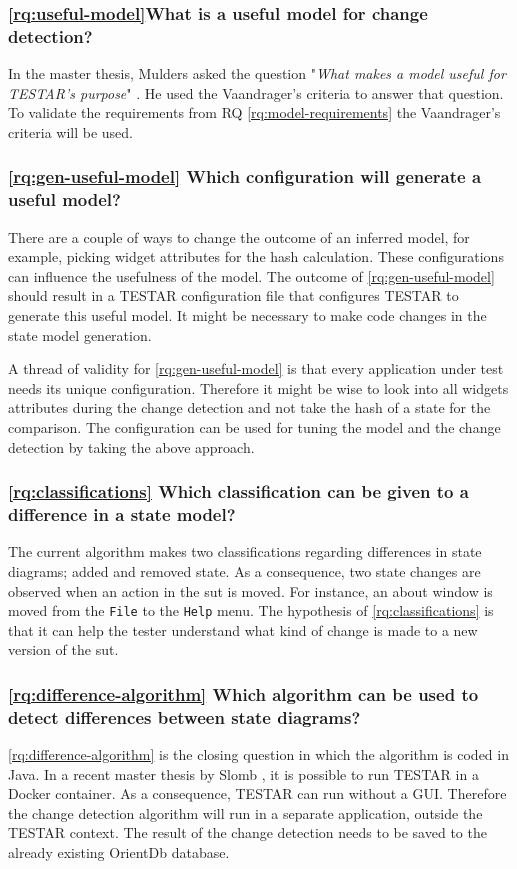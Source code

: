 \subsubsection{\ref{rq:useful-model}What is a useful model for change detection?}
In the master thesis, Mulders asked the question "\textit{What makes a model useful for TESTAR's purpose}" \cite{thesisMulders}. He used the Vaandrager's criteria \cite{vaandrager} to answer that question. To validate the requirements from RQ \ref{rq:model-requirements} the Vaandrager's criteria will be used. 

\subsubsection{\ref{rq:gen-useful-model} Which configuration will generate a useful model?}
There are a couple of ways to change the outcome of an inferred model, for example, picking widget attributes for the hash calculation. These configurations can influence the usefulness of the model. The outcome of \ref{rq:gen-useful-model} should result in a TESTAR configuration file that configures TESTAR to generate this useful model. It might be necessary to make code changes in the state model generation.

A thread of validity for \ref{rq:gen-useful-model} is that every application under test needs its unique configuration. Therefore it might be wise to look into all widgets attributes during the change detection and not take the hash of a state for the comparison. The configuration can be used for tuning the model and the change detection by taking the above approach.

\subsubsection{\ref{rq:classifications} Which classification can be given to a difference in a state model?}
The current algorithm \cite{stateDiff} makes two classifications regarding differences in state diagrams; added and removed state. As a consequence, two state changes are observed when an action in the \acrshort{sut} is moved. For instance, an about window is moved from the \verb|File| to the \verb|Help| menu. The hypothesis of \ref{rq:classifications} is that it can help the tester understand what kind of change is made to a new version of the \acrshort{sut}.

\subsubsection{\ref{rq:difference-algorithm} Which algorithm can be used to detect differences between state diagrams?}
\ref{rq:difference-algorithm} is the closing question in which the algorithm is coded in Java. In a recent master thesis by Slomb \cite{insert-slomb-hereTODO}, it is possible to run TESTAR in a Docker container. As a consequence, TESTAR can run without a GUI. Therefore the change detection algorithm will run in a separate application, outside the TESTAR context. The result of the change detection needs to be saved to the already existing OrientDb database. 

